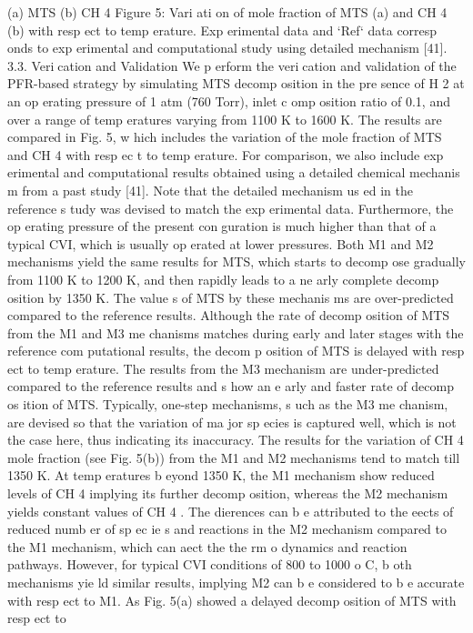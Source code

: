 \documentclass[10pt, letterpaper]{article}
\begin{document}
(a) MTS
(b) CH
4
Figure 5: Vari ati on of mole fraction of MTS (a) and CH
4
(b) with resp ect to temp erature. Exp erimental data and `Ref` data
corresp onds to exp erimental and computational study using detailed mechanism [41].
3.3. Verication and Validation
We p erform the verication and validation of the PFR-based strategy by simulating MTS decomp osition
in the pre sence of H
2
at an op erating pressure of 1 atm (760 Torr), inlet c omp osition ratio of 0.1, and over a
range of temp eratures varying from 1100 K to 1600 K. The results are compared in Fig. 5, w hich includes the
variation of the mole fraction of MTS and CH
4
with resp ec t to temp erature. For comparison, we also include
exp erimental and computational results obtained using a detailed chemical mechanis m from a past study
[41]. Note that the detailed mechanism us ed in the reference s tudy was devised to match the exp erimental
data. Furthermore, the op erating pressure of the present conguration is much higher than that of a typical
CVI, which is usually op erated at lower pressures.
Both M1 and M2 mechanisms yield the same results for MTS, which starts to decomp ose gradually
from 1100 K to 1200 K, and then rapidly leads to a ne arly complete decomp osition by 1350 K. The value s
of MTS by these mechanis ms are over-predicted compared to the reference results. Although the rate of
decomp osition of MTS from the M1 and M3 me chanisms matches during early and later stages with the
reference com putational results, the decom p osition of MTS is delayed with resp ect to temp erature. The
results from the M3 mechanism are under-predicted compared to the reference results and s how an e arly
and faster rate of decomp os ition of MTS. Typically, one-step mechanisms, s uch as the M3 me chanism, are
devised so that the variation of ma jor sp ecies is captured well, which is not the case here, thus indicating its
inaccuracy.
The results for the variation of CH
4
mole fraction (see Fig. 5(b)) from the M1 and M2 mechanisms tend to
match till 1350 K. At temp eratures b eyond 1350 K, the M1 mechanism show reduced levels of CH
4
implying
its further decomp osition, whereas the M2 mechanism yields constant values of CH
4
. The dierences can
b e attributed to the eects of reduced numb er of sp ec ie s and reactions in the M2 mechanism compared
to the M1 mechanism, which can aect the the rm o dynamics and reaction pathways. However, for typical
CVI conditions of 800 to 1000
o
C, b oth mechanisms yie ld similar results, implying M2 can b e considered
to b e accurate with resp ect to M1. As Fig. 5(a) showed a delayed decomp osition of MTS with resp ect to
\end{document}
